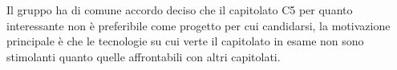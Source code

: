 Il gruppo ha di comune accordo deciso che il capitolato C5 per quanto interessante non è preferibile come progetto per cui candidarsi, la motivazione principale è che le tecnologie su cui verte il capitolato in esame non sono stimolanti quanto quelle affrontabili con altri capitolati.

